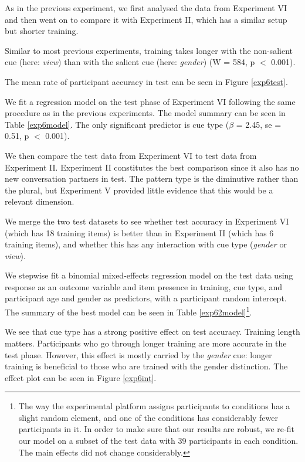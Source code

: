 \documentclass{frontiersSCNS} %
\begin{document}
As in the previous experiment, we first analysed the data from Experiment VI and then went on to compare it with Experiment II, which has a similar setup but shorter training.

Similar to most previous experiments, training takes longer with the non-salient cue (here: \emph{view}) than with the salient cue (here: \emph{gender}) (W = 584, p $<$ 0.001). 

The mean rate of participant accuracy in test can be seen in Figure \ref{exp6test}.

We fit a regression model on the test phase of Experiment VI following the same procedure as in the previous experiments. The model summary can be seen in Table \ref{exp6model}.  The only significant predictor is cue type ($\beta{}$ = 2.45, se = 0.51, p $<$ 0.001).

We then compare the test data from Experiment VI to test data from Experiment II. Experiment II  constitutes the best  comparison since it also has no new conversation partners in test. The pattern type is the diminutive rather than the plural, but Experiment V provided little evidence that this would be a relevant dimension.

We merge the two test datasets to see whether test accuracy in Experiment VI (which has 18 training items) is better than in Experiment II (which has 6 training items), and whether this has any interaction with cue type (\emph{gender} or \emph{view}).

We stepwise fit a binomial mixed-effects regression model on the test data using response as an outcome variable and item presence in training, cue type, and participant age and gender as predictors, with a participant random intercept. The summary of the best model can be seen in Table \ref{exp62model}\footnote{
The way the experimental platform assigns participants to conditions has a slight random element, and one of the conditions has considerably fewer participants in it. In order to make sure that our results are robust, we re-fit our model on a subset of the test data with 39 participants in each condition. The main effects did not change considerably.
}. 

We see that cue type has a strong positive effect on test accuracy. Training length matters. Participants who go through longer training are more accurate in the test phase. However, this effect is mostly carried by the {\it gender} cue: longer training is beneficial to those who are trained with the gender distinction. The effect plot can be seen in Figure \ref{exp6int}.
\end{document}
